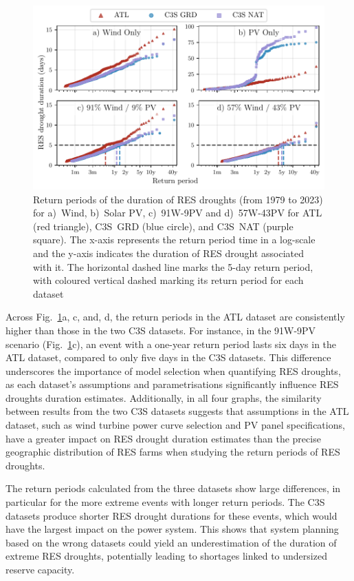 \documentclass[preprint, 12pt]{elsarticle}
\begin{document}
\begin{figure}[!ht]
	\centering
	\includegraphics[width=\textwidth]{droughts_return_periods.pdf}
	\caption{Return periods of the duration of RES droughts  (from 1979 to 2023) for a)~Wind, b)~Solar PV, c)~91W-9PV and d)~57W-43PV for ATL (red triangle), C3S~GRD (blue circle), and C3S~NAT (purple square). The x-axis represents the return period time in a log-scale and the y-axis indicates the duration of RES drought associated with it. The horizontal dashed line marks the 5-day return period, with coloured vertical dashed marking its return period for each dataset}
	\label{fig:return_periods}
\end{figure}

Across Fig.~\ref{fig:return_periods}a, c, and, d, the return periods in the ATL dataset are consistently higher than those in the two C3S datasets. For instance, in the 91W-9PV scenario (Fig.~\ref{fig:return_periods}c), an event with a one-year return period lasts six days in the ATL dataset, compared to only five days in the C3S datasets. This difference underscores the importance of model selection when quantifying RES droughts, as each dataset’s assumptions and parametrisations significantly influence RES droughts duration estimates. Additionally, in all four graphs, the similarity between results from the two C3S datasets suggests that assumptions in the ATL dataset, such as wind turbine power curve selection and PV panel specifications, have a greater impact on RES drought duration estimates than the precise geographic distribution of RES farms when studying the return periods of RES droughts.

The return periods calculated from the three datasets show large differences, in particular for the more extreme events with longer return periods. The C3S datasets produce shorter RES drought durations for these events, which would have the largest impact on the power system. This shows that system planning based on the wrong datasets could yield an underestimation of the duration of extreme RES droughts, potentially leading to shortages linked to undersized reserve capacity.
\end{document}

